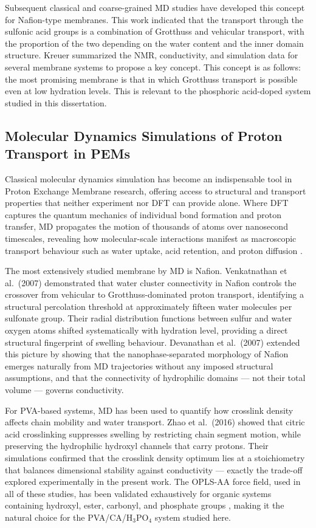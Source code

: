 \documentclass[12pt,a4paper]{report}
\begin{document}
Subsequent classical and coarse-grained MD studies have developed this concept for Nafion-type membranes. This work indicated that the transport through the sulfonic acid groups is a combination of Grotthuss and vehicular transport, with the proportion of the two depending on the water content and the inner domain structure.\cite{63} Kreuer summarized the NMR, conductivity, and simulation data for several membrane systems to propose a key concept. This concept is as follows: the most promising membrane is that in which Grotthuss transport is possible even at low hydration levels. This is relevant to the phosphoric acid-doped system studied in this dissertation.\cite{64}


\subsection{Molecular Dynamics Simulations of Proton Transport in PEMs}

Classical molecular dynamics simulation has become an indispensable 
tool in Proton Exchange Membrane research, offering access to structural 
and transport properties that neither experiment nor DFT can provide 
alone. Where DFT captures the quantum mechanics of individual bond 
formation and proton transfer, MD propagates the motion of thousands 
of atoms over nanosecond timescales, revealing how molecular-scale 
interactions manifest as macroscopic transport behaviour such as water 
uptake, acid retention, and proton diffusion \cite{64}.

The most extensively studied membrane by MD is Nafion. Venkatnathan 
et al.\ (2007) demonstrated that water cluster connectivity in Nafion 
controls the crossover from vehicular to Grotthuss-dominated proton 
transport, identifying a structural percolation threshold at 
approximately fifteen water molecules per sulfonate group. Their 
radial distribution functions between sulfur and water oxygen atoms 
shifted systematically with hydration level, providing a direct 
structural fingerprint of swelling behaviour. Devanathan et al.\ 
(2007) extended this picture by showing that the nanophase-separated 
morphology of Nafion emerges naturally from MD trajectories without 
any imposed structural assumptions, and that the connectivity of 
hydrophilic domains — not their total volume — governs conductivity.

For PVA-based systems, MD has been used to quantify how crosslink 
density affects chain mobility and water transport. Zhao et al.\ 
(2016) showed that citric acid crosslinking suppresses swelling by 
restricting chain segment motion, while preserving the hydrophilic 
hydroxyl channels that carry protons. Their simulations confirmed that 
the crosslink density optimum lies at a stoichiometry that balances 
dimensional stability against conductivity — exactly the trade-off 
explored experimentally in the present work. The OPLS-AA force field, 
used in all of these studies, has been validated exhaustively for 
organic systems containing hydroxyl, ester, carbonyl, and phosphate 
groups \cite{95}, making it the natural choice for the 
PVA/CA/H\(_3\)PO\(_4\) system studied here.
\end{document}
